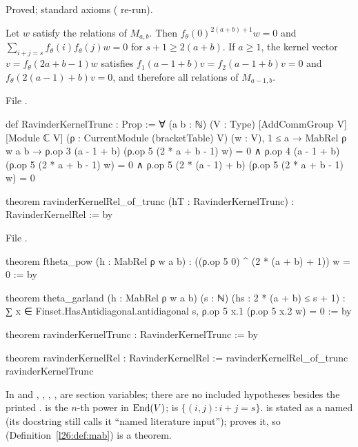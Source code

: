 \begin{status}
Proved; standard axioms ( re-run).
\end{status}

\begin{theorem}\label{l26:thm:kernelA2}
Let $w$ satisfy the relations of $M_{a,b}$. Then $f_\theta(0)^{2(a+b)+1}w=0$ and
$\sum_{i+j=s}f_\theta(i)f_\theta(j)w=0$ for $s+1\ge2(a+b)$. If $a\ge1$, the kernel vector $v=f_\theta(2a+b-1)w$ satisfies
$f_1(a-1+b)v=f_2(a-1+b)v=0$ and $f_\theta(2(a-1)+b)v=0$, and therefore all relations of $M_{a-1,b}$.
\end{theorem}
\noindent File .
\begin{leancode}
def RavinderKernelTrunc : Prop :=
  ∀ (a b : ℕ) (V : Type) [AddCommGroup V] [Module ℂ V] (ρ : CurrentModule (bracketTable) V) (w : V),
    1 ≤ a → MabRel ρ w a b →
      ρ.op 3 (a - 1 + b) (ρ.op 5 (2 * a + b - 1) w) = 0 ∧
      ρ.op 4 (a - 1 + b) (ρ.op 5 (2 * a + b - 1) w) = 0 ∧
      ρ.op 5 (2 * (a - 1) + b) (ρ.op 5 (2 * a + b - 1) w) = 0

theorem ravinderKernelRel_of_trunc (hT : RavinderKernelTrunc) : RavinderKernelRel := by
\end{leancode}
\noindent File .
\begin{leancode}
theorem ftheta_pow (h : MabRel ρ w a b) : ((ρ.op 5 0) ^ (2 * (a + b) + 1)) w = 0 := by

theorem theta_garland (h : MabRel ρ w a b) (s : ℕ) (hs : 2 * (a + b) ≤ s + 1) :
    ∑ x ∈ Finset.HasAntidiagonal.antidiagonal s, ρ.op 5 x.1 (ρ.op 5 x.2 w) = 0 := by

theorem ravinderKernelTrunc : RavinderKernelTrunc := by

theorem ravinderKernelRel : RavinderKernelRel := ravinderKernelRel_of_trunc ravinderKernelTrunc
\end{leancode}

\begin{dictionary}
In  and , , , ,  are section variables; there are no
included hypotheses besides the printed .  is the $n$-th power in
$\operatorname{End}(V)$;  is $\{(i,j):i+j=s\}$.  is stated as a named 
(its docstring still calls it ``named literature input'');  proves it, so
 (Definition~\ref{l26:def:mab}) is a theorem.
\end{dictionary}

